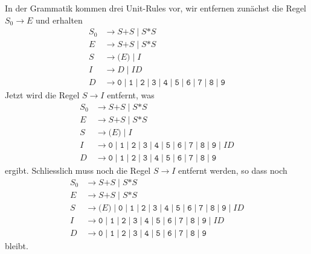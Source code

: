 \begin{loesung}
\begin{teilaufgaben}
In der Grammatik kommen drei Unit-Rules vor, wir entfernen zunächst die
Regel $S_0\to E$ und erhalten
\begin{align*}
S_0&\to S\texttt{+}S \;|\; S\texttt{*}S \\
E&\to S\texttt{+}S \;|\; S\texttt{*}S \\
S&\to \texttt{(}E\texttt{)} \;|\; I \\
I&\to D \;|\; I D \\
D&\to
\texttt{0}
\;|\;
\texttt{1}
\;|\;
\texttt{2}
\;|\;
\texttt{3}
\;|\;
\texttt{4}
\;|\;
\texttt{5}
\;|\;
\texttt{6}
\;|\;
\texttt{7}
\;|\;
\texttt{8}
\;|\;
\texttt{9}
\end{align*}
Jetzt wird die Regel $S\to I$ entfernt, was
\begin{align*}
S_0&\to S\texttt{+}S \;|\; S\texttt{*}S \\
E&\to S\texttt{+}S \;|\; S\texttt{*}S \\
S&\to \texttt{(}E\texttt{)} \;|\; I \\
I&\to 
\texttt{0}
\;|\;
\texttt{1}
\;|\;
\texttt{2}
\;|\;
\texttt{3}
\;|\;
\texttt{4}
\;|\;
\texttt{5}
\;|\;
\texttt{6}
\;|\;
\texttt{7}
\;|\;
\texttt{8}
\;|\;
\texttt{9}
\;|\; I D \\
D&\to
\texttt{0}
\;|\;
\texttt{1}
\;|\;
\texttt{2}
\;|\;
\texttt{3}
\;|\;
\texttt{4}
\;|\;
\texttt{5}
\;|\;
\texttt{6}
\;|\;
\texttt{7}
\;|\;
\texttt{8}
\;|\;
\texttt{9}
\end{align*}
ergibt.
Schliesslich muss noch die Regel $S\to I$ entfernt werden, so dass noch
\begin{align*}
S_0&\to S\texttt{+}S \;|\; S\texttt{*}S \\
E&\to S\texttt{+}S \;|\; S\texttt{*}S \\
S&\to \texttt{(}E\texttt{)} \;|\;
\texttt{0}
\;|\;
\texttt{1}
\;|\;
\texttt{2}
\;|\;
\texttt{3}
\;|\;
\texttt{4}
\;|\;
\texttt{5}
\;|\;
\texttt{6}
\;|\;
\texttt{7}
\;|\;
\texttt{8}
\;|\;
\texttt{9}
\;|\; I D \\
I&\to 
\texttt{0}
\;|\;
\texttt{1}
\;|\;
\texttt{2}
\;|\;
\texttt{3}
\;|\;
\texttt{4}
\;|\;
\texttt{5}
\;|\;
\texttt{6}
\;|\;
\texttt{7}
\;|\;
\texttt{8}
\;|\;
\texttt{9}
\;|\; I D \\
D&\to
\texttt{0}
\;|\;
\texttt{1}
\;|\;
\texttt{2}
\;|\;
\texttt{3}
\;|\;
\texttt{4}
\;|\;
\texttt{5}
\;|\;
\texttt{6}
\;|\;
\texttt{7}
\;|\;
\texttt{8}
\;|\;
\texttt{9}
\end{align*}
bleibt.


\end{teilaufgaben}
\end{loesung}
